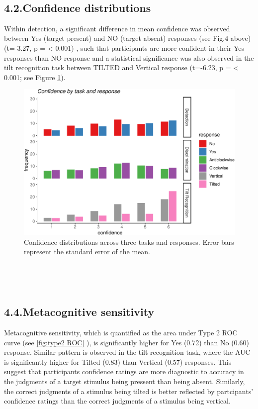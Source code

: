 \documentclass[]{article}
\begin{document}
~

\hypertarget{confidence-distributions}{%
\subsection{4.2.Confidence
distributions}\label{confidence-distributions}}

Within detection, a significant difference in mean confidence was
observed between Yes (target present) and NO (target absent) responses
(see Fig.4 above) (t=-3.27, p = \textless{} 0.001) , such that
participants are more confident in their Yes responses than NO response
and a statistical significance was also observed in the tilt recognition
task between TILTED and Vertical response (t=-6.23, p = \textless{}
0.001; see Figure \ref{fig:confidence}).

\begin{figure}
\centering
\includegraphics{Chudi-Thesis_files/figure-latex/unnamed-chunk-4-1.pdf}
\caption{\label{fig:confidence} Confidence distributions across three
tasks and responses. Error bars represent the standard error of the
mean.}
\end{figure}

~

~

\hypertarget{metacognitive-sensitivity}{%
\subsection{4.4.Metacognitive
sensitivity}\label{metacognitive-sensitivity}}

Metacognitive sensitivity, which is quantified as the area under Type 2
ROC curve (see \ref{fig:type2 ROC} ), is significantly higher for Yes
(0.72) than No (0.60) response. Similar pattern is observed in the tilt
recognition task, where the AUC is significantly higher for Tilted
(0.83) than Vertical (0.57) responses. This suggest that participants
confidence ratings are more diagnostic to accuracy in the judgments of a
target stimulus being pressent than being absent. Similarly, the correct
judgments of a stimulus being tilted is better reflected by partcipants'
confidence ratings than the correct judgments of a stimulus being
vertical.
\end{document}
